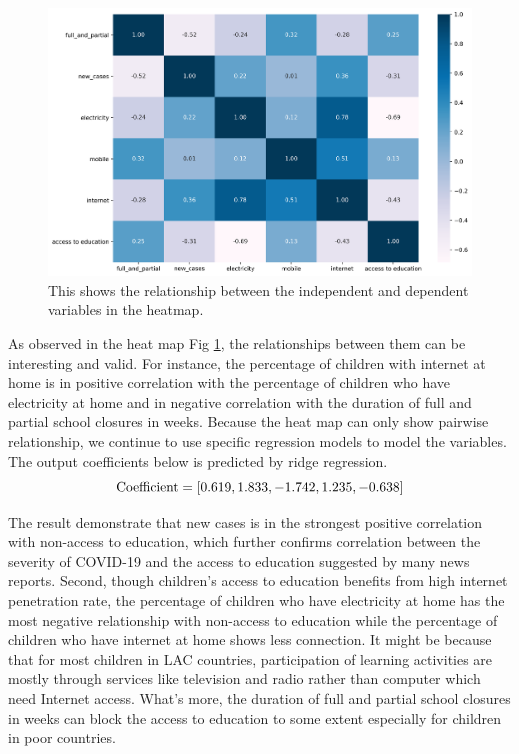 \documentclass{article}
\begin{document}
\begin{figure}[h]
\centering
\includegraphics[width=1.0\columnwidth]{heatmap.png}%
\caption{This shows the relationship between the independent and dependent variables in the heatmap.}
\label{fig3}
\end{figure}

As observed in the heat map Fig \ref{fig3}, the relationships between them can be interesting and valid. For instance, the percentage of children with internet at home is in positive correlation with the percentage of children who have electricity at home and in negative correlation with the duration of full and partial school closures in weeks. Because the heat map can only show pairwise relationship, we continue to use specific regression models to model the variables. The output coefficients below is predicted by ridge regression.
\begin{equation}
    \rm Coefficient = [0.619, 1.833, -1.742, 1.235, -0.638]
\end{equation}

The result demonstrate that new cases is in the strongest positive correlation with non-access to education, which further confirms correlation between the severity of COVID-19 and the access to education suggested by many news reports. Second, though children's access to education benefits from high internet penetration rate, the percentage of children who have electricity at home has the most negative relationship with non-access to education while the percentage of children who have internet at home shows less connection. It might be because that for most children in LAC countries, participation of learning activities are mostly through services like television and radio rather than computer which need Internet access. What's more, the duration of full and partial school closures in weeks can block the access to education to some extent especially for children in poor countries. 
\end{document}
